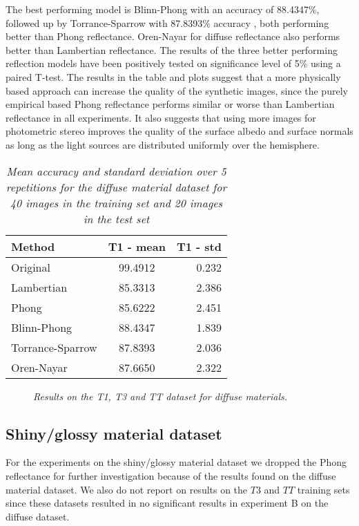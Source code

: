The best performing model is Blinn-Phong with an accuracy of 88.4347\%, followed up by Torrance-Sparrow with 87.8393\% accuracy , both performing better than Phong reflectance. Oren-Nayar for diffuse reflectance also performs better than Lambertian reflectance. The results of the three better performing reflection models have been positively tested on significance level of 5\% using a paired T-test. The results in the table and plots suggest that a more physically based approach can increase the quality of the synthetic images, since the purely empirical based Phong reflectance performs similar or worse than Lambertian reflectance in all experiments. It also suggests that using more images for photometric stereo improves the quality of the surface albedo and surface normals as long as the light sources are distributed uniformly over the hemisphere.

\begin{table}
	\center
	\begin{tabular}{l|c|r}
	Method 				&	T1 - mean 	& T1 - std \\
	\hline
	Original			&	99.4912		& 0.232 \\
	Lambertian 			&	85.3313		& 2.386 \\
	Phong 				&	85.6222		& 2.451 \\
	Blinn-Phong 		& 	88.4347 	& 1.839 \\
	Torrance-Sparrow 	&	87.8393 	& 2.036 \\
	Oren-Nayar 			&	87.6650 	& 2.322 \\
	\end{tabular}
	\caption{{\it Mean accuracy and standard deviation over 5 repetitions for the diffuse material dataset for 40 images in the training set and 20 images in the test set}}
	\label{tab:DiffuseResultsB}
\end{table}

\begin{figure}[H]
	\begin{center}
	\end{center}
	\caption{{\it Results on the T1, T3 and TT dataset for diffuse materials.}}
	\label{fig:DiffusePlotB}
\end{figure}

\subsection{Shiny/glossy material dataset}
For the experiments on the shiny/glossy material dataset we dropped the Phong reflectance for further investigation because of the results found on the diffuse material dataset. We also do not report on results on the $T3$ and $TT$ training sets since these datasets resulted in no significant results in experiment B on the diffuse dataset.

